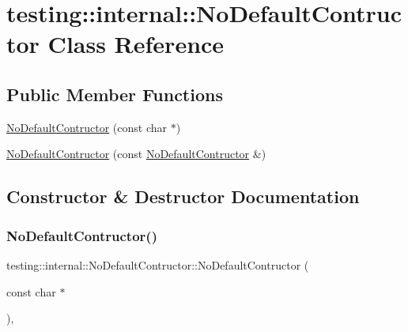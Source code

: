 \hypertarget{classtesting_1_1internal_1_1NoDefaultContructor}{}\section{testing\+::internal\+::No\+Default\+Contructor Class Reference}
\label{classtesting_1_1internal_1_1NoDefaultContructor}
\subsection*{Public Member Functions}
\begin{DoxyCompactItemize}
\item 
\mbox{\hyperlink{classtesting_1_1internal_1_1NoDefaultContructor_a34c9cdf833476a9718141dcff931ba42}{No\+Default\+Contructor}} (const char $\ast$)
\item 
\mbox{\hyperlink{classtesting_1_1internal_1_1NoDefaultContructor_acba74b55a8c5341808ecb5b9318eaecf}{No\+Default\+Contructor}} (const \mbox{\hyperlink{classtesting_1_1internal_1_1NoDefaultContructor}{No\+Default\+Contructor}} \&)
\end{DoxyCompactItemize}


\subsection{Constructor \& Destructor Documentation}
\mbox{\label{classtesting_1_1internal_1_1NoDefaultContructor_a34c9cdf833476a9718141dcff931ba42}} 
\subsubsection{\texorpdfstring{NoDefaultContructor()}{NoDefaultContructor()}\hspace{0.1cm}{\footnotesize\ttfamily [1/2]}}
{\footnotesize\ttfamily testing\+::internal\+::\+No\+Default\+Contructor\+::\+No\+Default\+Contructor (\begin{DoxyParamCaption}\item[{const char $\ast$}]{ }\end{DoxyParamCaption})\hspace{0.3cm}{\ttfamily [inline]}, {\ttfamily [explicit]}}

